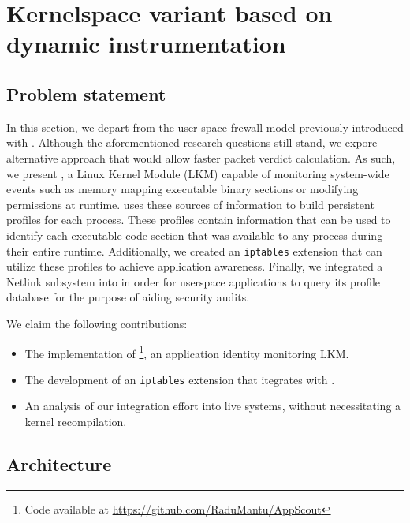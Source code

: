 \section{Kernelspace variant based on dynamic instrumentation}
\label{appfw:appscout}

\subsection{Problem statement}
\label{apffw:appscout:intro}

In this section, we depart from the user space frewall model previously introduced with \daf{}. Although the aforementioned research questions still stand, we expore alternative approach that would allow faster packet verdict calculation. As such, we present \scout{}, a Linux Kernel Module (LKM) capable of monitoring system-wide events such as memory mapping executable binary sections or modifying permissions at runtime. \scout{} uses these sources of information to build persistent profiles for each process. These profiles contain information that can be used to identify each executable code section that was available to any process during their entire runtime. Additionally, we created an \texttt{iptables} extension that can utilize these profiles to achieve application awareness. Finally, we integrated a Netlink subsystem into \scout{} in order for userspace applications to query its profile database for the purpose of aiding security audits.

We claim the following contributions:
\begin{itemize}
    \item The implementation of \scout{}\footnote{Code available at \url{https://github.com/RaduMantu/AppScout}}, an application identity monitoring LKM.

    \item The development of an \texttt{iptables} extension that itegrates with \scout{}.

    \item An analysis of our integration effort into live systems, without necessitating a kernel recompilation.
\end{itemize}

\subsection{Architecture}
\label{apffw:appscout:architecture}

